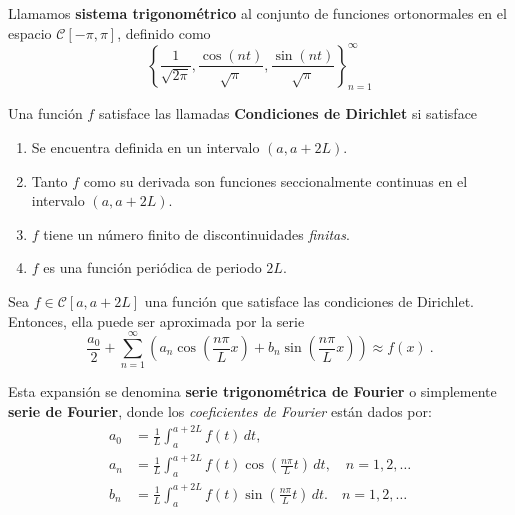 \begin{defi} 
    Llamamos \textbf{sistema trigonométrico} al conjunto de funciones ortonormales en el espacio $\mathscr{C}[-\pi,\pi]$, definido como
    $$\left\{ \frac{1}{\sqrt{2\pi}}, \frac{\cos(nt)}{\sqrt{\pi}}, \frac{\sin(nt)}{\sqrt{\pi}} \right\}_{n=1}^{\infty}$$
\end{defi}

\begin{defi} 
    Una función $f$ satisface las llamadas \textbf{Condiciones de Dirichlet} si satisface
    \begin{enumerate}
        \item Se encuentra definida en un intervalo $(a,a+2L)$.
        \item Tanto $f$ como su derivada son funciones seccionalmente continuas en el intervalo $(a,a+2L)$.
        \item $f$ tiene un número finito de discontinuidades \emph{finitas}.
        \item $f$ es una función periódica de periodo $2L$.
    \end{enumerate}

\end{defi}

\begin{defi} 
Sea $f \in \mathscr{C}[a, a+2L]$ una función que satisface las condiciones de Dirichlet. Entonces, ella puede ser aproximada por la serie 
\begin{equation}
    \frac{a_0}{2} + \sum_{n=1}^{\infty} \left( a_n \cos\left( \frac{n\pi}{L}x \right) + b_n \sin\left( \frac{n\pi}{L}x \right) \right) \approx f(x) \ . \label{FourierTrigo}
\end{equation}

Esta expansión se denomina \textbf{serie trigonométrica de Fourier} o simplemente \textbf{serie de Fourier}, donde los \textit{coeficientes de Fourier} están dados por:
\begin{align*}
    a_0 &= \frac{1}{L} \int_{a}^{a+2L} f(t) \,dt, \\
    a_n &= \frac{1}{L} \int_{a}^{a+2L} f(t) \cos\left( \frac{n\pi}{L}t \right) \,dt, \quad n = 1,2, \dots\\
    b_n &= \frac{1}{L} \int_{a}^{a+2L} f(t) \sin\left( \frac{n\pi}{L}t \right) \,dt. \quad n = 1,2, \dots
\end{align*}
\end{defi}

